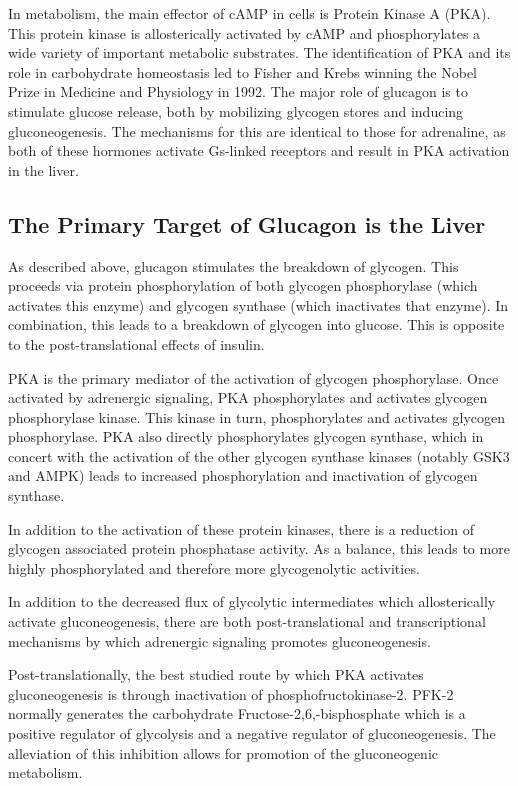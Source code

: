 \documentclass{tufte-handout}
\begin{document}
In metabolism, the main effector of cAMP in cells is Protein Kinase A (PKA).  This protein kinase is allosterically activated by cAMP and phosphorylates a wide variety of important metabolic substrates.  The identification of PKA and its role in carbohydrate homeostasis led to Fisher and Krebs winning the Nobel Prize in Medicine and Physiology in 1992.  The major role of glucagon is to stimulate glucose release, both by mobilizing glycogen stores and inducing gluconeogenesis.  The mechanisms for this are identical to those for adrenaline, as both of these hormones activate Gs-linked receptors and result in PKA activation in the liver.

\subsection{The Primary Target of Glucagon is the Liver}

As described above, glucagon stimulates the breakdown of glycogen.  This proceeds via protein phosphorylation of both glycogen phosphorylase (which activates this enzyme) and glycogen synthase (which inactivates that enzyme).  In combination, this leads to a breakdown of glycogen into glucose.  This is opposite to the post-translational effects of insulin.

PKA is the primary mediator of the activation of glycogen phosphorylase.  Once activated by adrenergic signaling, PKA phosphorylates and activates glycogen phosphorylase kinase.  This kinase in turn, phosphorylates and activates glycogen phosphorylase\cite{Krebs1956}.  PKA also directly phosphorylates glycogen synthase, which in concert with the activation of the other glycogen synthase kinases (notably GSK3 and AMPK) leads to increased phosphorylation and inactivation of glycogen synthase.

In addition to the activation of these protein kinases, there is a reduction of glycogen associated protein phosphatase activity.  As a balance, this leads to more highly phosphorylated and therefore more glycogenolytic activities.

  In addition to the decreased flux of glycolytic intermediates which allosterically activate gluconeogenesis, there are both post-translational and transcriptional mechanisms by which adrenergic signaling promotes gluconeogenesis.  

Post-translationally, the best studied route by which PKA activates gluconeogenesis is through inactivation of phosphofructokinase-2.  PFK-2 normally generates the carbohydrate Fructose-2,6,-bisphosphate which is a positive regulator of glycolysis and a negative regulator of gluconeogenesis.  The alleviation of this inhibition allows for promotion of the gluconeogenic metabolism.  
\end{document}
